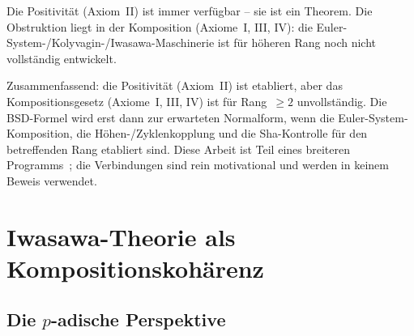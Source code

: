 \documentclass[aps,prd,twocolumn,superscriptaddress,nofootinbib,floatfix]{revtex4-2}
\theoremstyle{definition}
\theoremstyle{remark}
\begin{document}
Die \glqq Positivität\grqq{} (Axiom~II) ist immer verfügbar -- sie ist ein Theorem. Die Obstruktion liegt in der \glqq Komposition\grqq{} (Axiome~I, III, IV): die Euler-System-/Kolyvagin-/Iwasawa-Maschinerie ist für höheren Rang noch nicht vollständig entwickelt.

Zusammenfassend: die Positivität (Axiom~II) ist etabliert, aber das Kompositionsgesetz (Axiome~I, III, IV) ist für Rang~$\geq 2$ unvollständig. Die BSD-Formel wird erst dann zur erwarteten Normalform, wenn die Euler-System-Komposition, die Höhen-/Zyklenkopplung und die Sha-Kontrolle für den betreffenden Rang etabliert sind. Diese Arbeit ist Teil eines breiteren Programms~\cite{Geiger2026e}; die Verbindungen sind rein motivational und werden in keinem Beweis verwendet.


\clearpage
\section{Iwasawa-Theorie als Kompositionskohärenz}
\label{sec:iwasawa}

\subsection{\texorpdfstring{Die $p$-adische Perspektive}{Die p-adische Perspektive}}
\end{document}
